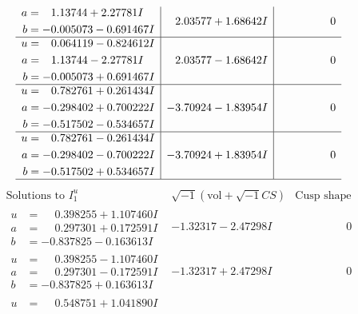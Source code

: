 \documentclass[1p]{elsarticle_modified}
\theoremstyle{definition}
\newcommand{\I}{\sqrt{-1}}
\begin{document}
$$\begin{array}{c|c|c}
\begin{aligned}
a &= \phantom{-}1.13744 + 2.27781 I \\
b &= -0.005073 - 0.691467 I\end{aligned}
 & \phantom{-}2.03577 + 1.68642 I & \phantom{-0.000000 } 0 \\ \hline\begin{aligned}
u &= \phantom{-}0.064119 - 0.824612 I \\
a &= \phantom{-}1.13744 - 2.27781 I \\
b &= -0.005073 + 0.691467 I\end{aligned}
 & \phantom{-}2.03577 - 1.68642 I & \phantom{-0.000000 } 0 \\ \hline\begin{aligned}
u &= \phantom{-}0.782761 + 0.261434 I \\
a &= -0.298402 + 0.700222 I \\
b &= -0.517502 - 0.534657 I\end{aligned}
 & -3.70924 - 1.83954 I & \phantom{-0.000000 } 0 \\ \hline\begin{aligned}
u &= \phantom{-}0.782761 - 0.261434 I \\
a &= -0.298402 - 0.700222 I \\
b &= -0.517502 + 0.534657 I\end{aligned}
 & -3.70924 + 1.83954 I & \phantom{-0.000000 } 0\\
 \hline 
 \end{array}$$\newpage$$\begin{array}{c|c|c}  
\text{Solutions to }I^u_{1}& \I (\text{vol} + \sqrt{-1}CS) & \text{Cusp shape}\\
 \hline 
\begin{aligned}
u &= \phantom{-}0.398255 + 1.107460 I \\
a &= \phantom{-}0.297301 + 0.172591 I \\
b &= -0.837825 - 0.163613 I\end{aligned}
 & -1.32317 - 2.47298 I & \phantom{-0.000000 } 0 \\ \hline\begin{aligned}
u &= \phantom{-}0.398255 - 1.107460 I \\
a &= \phantom{-}0.297301 - 0.172591 I \\
b &= -0.837825 + 0.163613 I\end{aligned}
 & -1.32317 + 2.47298 I & \phantom{-0.000000 } 0 \\ \hline\begin{aligned}
u &= \phantom{-}0.548751 + 1.041890 I \\

\end{aligned}
\end{array}$$
\end{document}
